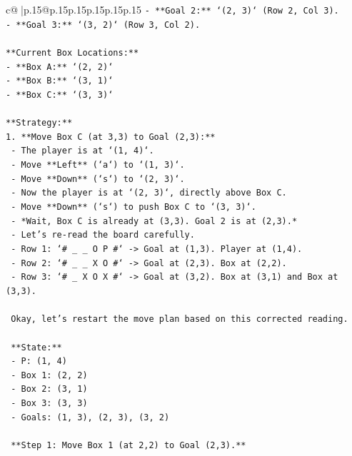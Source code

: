 \documentclass{article}
\begin{document}
{\begin{supertabular}{c@{$\;$}|p{.15\linewidth}@{}p{.15\linewidth}p{.15\linewidth}p{.15\linewidth}p{.15\linewidth}p{.15\linewidth}}
{{{\texttt{{-} **Goal 2:** `(2, 3)` (Row 2, Col 3).} \\
\texttt{{-} **Goal 3:** `(3, 2)` (Row 3, Col 2).} \\
\\ 
\texttt{**Current Box Locations:**} \\
\texttt{{-} **Box A:** `(2, 2)`} \\
\texttt{{-} **Box B:** `(3, 1)`} \\
\texttt{{-} **Box C:** `(3, 3)`} \\
\\ 
\texttt{**Strategy:**} \\
\texttt{1.  **Move Box C (at 3,3) to Goal (2,3):**} \\
\texttt{    {-} The player is at `(1, 4)`.} \\
\texttt{    {-} Move **Left** (`a`) to `(1, 3)`.} \\
\texttt{    {-} Move **Down** (`s`) to `(2, 3)`.} \\
\texttt{    {-} Now the player is at `(2, 3)`, directly above Box C.} \\
\texttt{    {-} Move **Down** (`s`) to push Box C to `(3, 3)`.} \\
\texttt{    {-} *Wait, Box C is already at (3,3). Goal 2 is at (2,3).*} \\
\texttt{    {-} Let's re{-}read the board carefully.} \\
\texttt{    {-} Row 1: `\# \_ \_ O P \#` {-}> Goal at (1,3). Player at (1,4).} \\
\texttt{    {-} Row 2: `\# \_ \_ X O \#` {-}> Goal at (2,3). Box at (2,2).} \\
\texttt{    {-} Row 3: `\# \_ X O X \#` {-}> Goal at (3,2). Box at (3,1) and Box at (3,3).} \\
\\ 
\texttt{    Okay, let's restart the move plan based on this corrected reading.} \\
\\ 
\texttt{    **State:**} \\
\texttt{    {-} P: (1, 4)} \\
\texttt{    {-} Box 1: (2, 2)} \\
\texttt{    {-} Box 2: (3, 1)} \\
\texttt{    {-} Box 3: (3, 3)} \\
\texttt{    {-} Goals: (1, 3), (2, 3), (3, 2)} \\
\\ 
\texttt{    **Step 1: Move Box 1 (at 2,2) to Goal (2,3).**} \\
}}}
\end{supertabular}}
\end{document}
